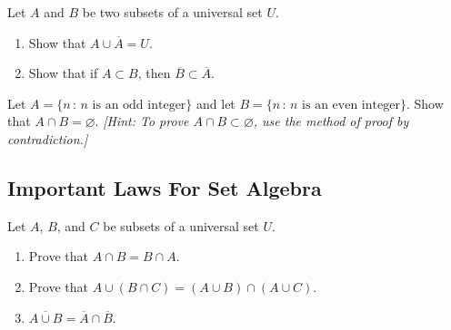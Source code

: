 \begin{problem}
Let $A$ and $B$ be two subsets of a universal set $U$.
    \begin{enumerate}[label=\alph*)]
        \item Show that $A \cup \overline{A} = U$.
        \item Show that if $A \subset B$, then $\overline{B} \subset \overline{A}$.
    \end{enumerate}
\end{problem}

\begin{problem}
Let $A = \{ n \, : \, n \text{ is an odd integer}\}$ and let $B = \{ n \, : \, n \text{ is an even integer}\}$. Show that $A \cap B = \varnothing$. \textit{[Hint: To prove $A \cap B \subset \varnothing$, use the method of proof by contradiction.]}
\end{problem}

\subsection{Important Laws For Set Algebra}

\begin{problem}
Let $A$, $B$, and $C$ be subsets of a universal set $U$.
    \begin{enumerate}[label=\alph*)]
        \item Prove that $A \cap B = B \cap A$.
        \item Prove that $A \cup (B \cap C) = (A \cup B) \cap (A \cup C)$.
        \item $\overline{A \cup B} = \overline{A} \cap \overline{B}$.
    \end{enumerate}
\end{problem}


